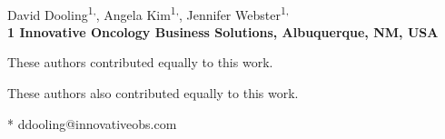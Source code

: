 \documentclass[10pt,letterpaper]{article}
\date{}
\begin{document}
\vspace*{0.35in}

\begin{flushleft}
{\Large
\textbf{}
}
\newline
\\
David Dooling\textsuperscript{1,\Yinyang},
Angela  Kim\textsuperscript{1,\ddag},
Jennifer Webster\textsuperscript{1,\Yinyang}
\\
\bigskip
\bf{1} Innovative Oncology Business Solutions, Albuquerque, NM, USA
\\
\bigskip

% 
%
\Yinyang These authors contributed equally to this work.

\ddag These authors also contributed equally to this work.




* ddooling@innovativeobs.com

\end{flushleft}
\end{document}
